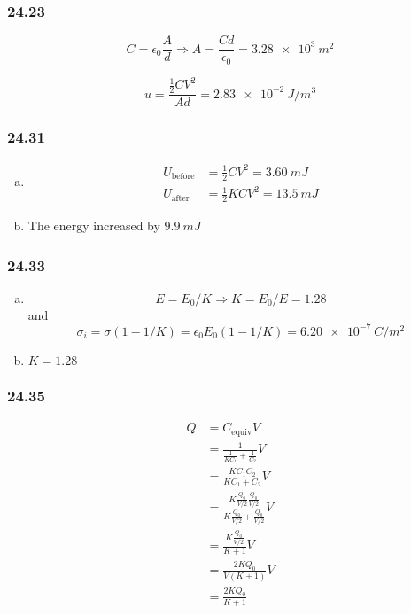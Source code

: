\documentclass{article}
\begin{document}
\subsubsection{24.23}

\[C = \epsilon_0 \frac{A}{d} \Rightarrow A = \frac{C d}{\epsilon_0} = \qty{3.28e3}{m^2}\]

\[u = \frac{\frac{1}{2} C V^2}{A d} = \qty{2.83e-2}{J/m^3}\]

\subsubsection{24.31}

\begin{enumerate}[(a)]
  \item

        \begin{align*}
          U_\textrm{before} & = \frac{1}{2} C V^2 = \qty{3.60}{mJ}   \\
          U_\textrm{after}  & = \frac{1}{2} K C V^2 = \qty{13.5}{mJ}
        \end{align*}

  \item The energy increased by $\qty{9.9}{mJ}$
\end{enumerate}

\subsubsection{24.33}

\begin{enumerate}[(a)]
  \item \[E = E_0 / K \Rightarrow K = E_0 / E = 1.28\] and \[\sigma_i = \sigma (1 - 1 / K) = \epsilon_0 E_0 (1 - 1 / K) = \qty{6.20e-7}{C/m^2}\]

  \item $K = 1.28$
\end{enumerate}

\subsubsection{24.35}

\begin{align*}
  Q & = C_\textrm{equiv} V                                                                      \\
    & = \frac{1}{\frac{1}{K C_1} + \frac{1}{C_2}} V                                             \\
    & = \frac{K C_1 C_2}{K C_1 + C_2} V                                                         \\
    & = \frac{K \frac{Q_0}{V / 2} \frac{Q_0}{V / 2}}{K \frac{Q_0}{V / 2} + \frac{Q_0}{V / 2}} V \\
    & = \frac{K \frac{Q_0}{V / 2}}{K + 1} V                                                     \\
    & = \frac{2 K Q_0}{V (K + 1)} V                                                             \\
    & = \frac{2 K Q_0}{K + 1}
\end{align*}
\end{document}
